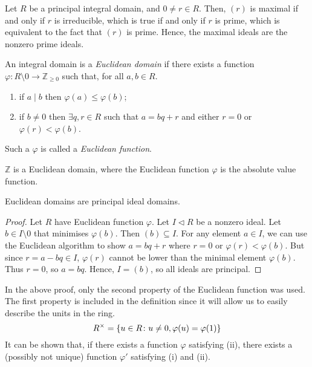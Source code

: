 \begin{remark}
	Let \( R \) be a principal integral domain, and \( 0 \neq r \in R \).
	Then, \( (r) \) is maximal if and only if \( r \) is irreducible, which is true if and only if \( r \) is prime, which is equivalent to the fact that \( (r) \) is prime.
	Hence, the maximal ideals are the nonzero prime ideals.
\end{remark}
\begin{definition}
	An integral domain is a \textit{Euclidean domain} if there exists a function \( \varphi \colon R \setminus \qty{0} \to \mathbb Z_{\geq 0} \) such that, for all \( a, b \in R \).
	\begin{enumerate}
		\item if \( a \mid b \) then \( \varphi(a) \leq \varphi(b) \);
		\item if \( b \neq 0 \) then \( \exists q, r \in R \) such that \( a = bq + r \) and either \( r = 0 \) or \( \varphi(r) < \varphi(b) \).
	\end{enumerate}
	Such a \( \varphi \) is called a \textit{Euclidean function}.
\end{definition}
\begin{example}
	\( \mathbb Z \) is a Euclidean domain, where the Euclidean function \( \varphi \) is the absolute value function.
\end{example}
\begin{proposition}
	Euclidean domains are principal ideal domains.
\end{proposition}
\begin{proof}
	Let \( R \) have Euclidean function \( \varphi \).
	Let \( I \triangleleft R \) be a nonzero ideal.
	Let \( b \in I \setminus \qty{0} \) that minimises \( \varphi(b) \).
	Then \( (b) \subseteq I \).
	For any element \( a \in I \), we can use the Euclidean algorithm to show \( a = bq + r \) where \( r = 0 \) or \( \varphi(r) < \varphi(b) \).
	But since \( r = a - bq \in I \), \( \varphi(r) \) cannot be lower than the minimal element \( \varphi(b) \).
	Thus \( r = 0 \), so \( a = bq \).
	Hence, \( I = (b) \), so all ideals are principal.
\end{proof}
\begin{remark}
	In the above proof, only the second property of the Euclidean function was used.
	The first property is included in the definition since it will allow us to easily describe the units in the ring.
	\[
		R^\times = \qty{u \in R \colon u \neq 0, \varphi(u) = \varphi(1)}
	\]
	It can be shown that, if there exists a function \( \varphi \) satisfying (ii), there exists a (possibly not unique) function \( \varphi' \) satisfying (i) and (ii).
\end{remark}
